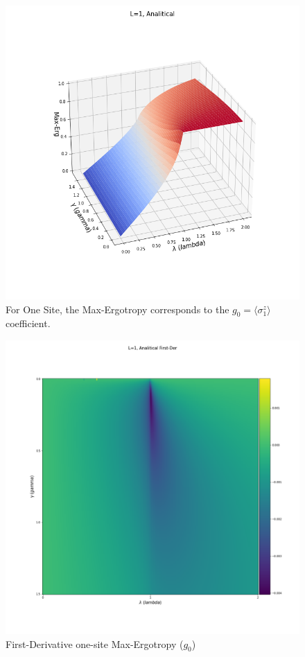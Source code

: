 \documentclass[12pt,a4paper]{book}
\theoremstyle{definition}
\begin{document}
\begin{figure}[h]
	\centering
	\includegraphics[width=\linewidth]{graphs/3dplot_g0}
	\caption{For One Site, the Max-Ergotropy corresponds to the $g_0 = \langle{\sigma}_{1}^{z}\rangle$ coefficient.   }
	\label{fig:g0gammas}
\end{figure}
\begin{figure}[h]
	\centering
	\includegraphics[width=\linewidth]{./graphs/planarplot_firstder_onesite}
	\caption{First-Derivative one-site Max-Ergotropy ($g_0$)}
	\label{fig:onesitesecdev}
\end{figure}
\end{document}

